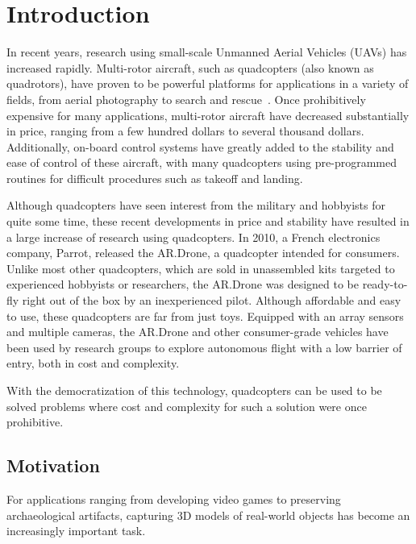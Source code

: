 
\chapter{Introduction\label{ch:intro}}

In recent years, research using small-scale Unmanned Aerial Vehicles (UAVs) has increased rapidly. Multi-rotor aircraft, such as quadcopters (also known as quadrotors), have proven to be powerful platforms for applications in a variety of fields, from aerial photography to search and rescue~\cite{Irschara, Gupte}. Once prohibitively expensive for many applications, multi-rotor aircraft have decreased substantially in price, ranging from a few hundred dollars to several thousand dollars. Additionally, on-board control systems have greatly added to the stability and ease of control of these aircraft, with many quadcopters using pre-programmed routines for difficult procedures such as takeoff and landing.


Although quadcopters have seen interest from the military and hobbyists for quite some time, these recent developments in price and stability have resulted in a large increase of research using quadcopters. In 2010, a French electronics company, Parrot, released the AR.Drone, a quadcopter intended for consumers. Unlike most other quadcopters, which are sold in unassembled kits targeted to experienced hobbyists or researchers, the AR.Drone was designed to be ready-to-fly right out of the box by an inexperienced pilot. Although affordable and easy to use, these quadcopters are far from just toys. Equipped with an array sensors and multiple cameras, the AR.Drone and other consumer-grade vehicles have been used by research groups to explore autonomous flight with a low barrier of entry, both in cost and complexity.

With the democratization of this technology, quadcopters can be used to be solved problems where cost and complexity for such a solution were once prohibitive.

\section{Motivation}

For applications ranging from developing video games to preserving archaeological artifacts, capturing 3D models of real-world objects has become an increasingly important task. %


